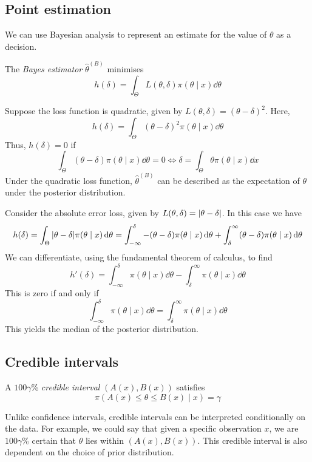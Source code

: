 \subsection{Point estimation}
We can use Bayesian analysis to represent an estimate for the value of \( \theta \) as a decision.
\begin{definition}
	The \textit{Bayes estimator} \( \hat \theta^{(B)} \) minimises
	\[
		h(\delta) = \int_\Theta L(\theta, \delta) \pi(\theta \mid x) \dd{\theta}
	\]
\end{definition}
\begin{example}
	Suppose the loss function is quadratic, given by \( L(\theta, \delta) = (\theta-\delta)^2 \).
	Here,
	\[
		h(\delta) = \int_\Theta (\theta - \delta)^2 \pi(\theta \mid x) \dd{\theta}
	\]
	Thus, \( h(\delta) = 0 \) if
	\[
		\int_\Theta (\theta - \delta) \pi(\theta \mid x) \dd{\theta} = 0 \iff \delta = \int_\Theta \theta \pi(\theta \mid x) \dd{x}
	\]
	Under the quadratic loss function, \( \hat \theta^{(B)} \) can be described as the expectation of \( \theta \) under the posterior distribution.
\end{example}
\begin{example}
	Consider the absolute error loss, given by \( L(\theta, \delta) = \abs{\theta - \delta} \).
	In this case we have
	\[
		h(\delta) = \int_\Theta \abs{\theta - \delta} \pi(\theta \mid x) \dd{\theta} = \int_{-\infty}^\delta -(\theta-\delta)\pi(\theta \mid x)\dd{\theta} + \int_\delta^\infty (\theta-\delta)\pi(\theta \mid x)\dd{\theta}
	\]
	We can differentiate, using the fundamental theorem of calculus, to find
	\[
		h'(\delta) = \int_{-\infty}^\delta \pi(\theta\mid x) \dd{\theta} - \int_\delta^\infty \pi(\theta \mid x)\dd{\theta}
	\]
	This is zero if and only if
	\[
		\int_{-\infty}^\delta \pi(\theta\mid x) \dd{\theta} = \int_\delta^{\infty} \pi(\theta \mid x) \dd{\theta}
	\]
	This yields the median of the posterior distribution.
\end{example}

\subsection{Credible intervals}
\begin{definition}
	A \( 100\gamma \)\% \textit{credible interval} \( (A(x), B(x)) \) satisfies
	\[
		\pi(A(x) \leq \theta \leq B(x) \mid x) = \gamma
	\]
\end{definition}
\begin{remark}
	Unlike confidence intervals, credible intervals can be interpreted conditionally on the data.
	For example, we could say that given a specific observation \( x \), we are \( 100 \gamma \)\% certain that \( \theta \) lies within \( (A(x), B(x)) \).
	This credible interval is also dependent on the choice of prior distribution.
\end{remark}
